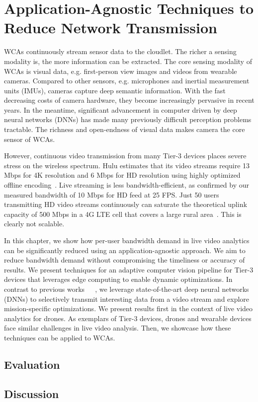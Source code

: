 \chapter{Application-Agnostic Techniques to Reduce Network Transmission}
\label{chapter: bandwidth}

WCAs continuously stream sensor data to the cloudlet. The richer a sensing
modality is, the more information can be extracted. The core sensing modality of
WCAs is visual data, e.g. first-person view images and videos from wearable
cameras. Compared to other sensors, e.g. microphones and inertial measurement
units (IMUs), cameras capture deep semantic information. With the fast
decreasing costs of camera hardware, they become increasingly pervasive in
recent years. In the meantime, significant advancement in computer driven by
deep neural networks (DNNs) has made many previously difficult perception
problems tractable. The richness and open-endness of visual data makes camera
the core sensor of WCAs.

However, continuous video transmission from many Tier-3 devices places severe
stress on the wireless spectrum.  Hulu estimates that its video streams require
13 Mbps for 4K resolution and 6 Mbps for HD resolution using highly optimized
offline encoding~\cite{Hulu2017}. Live streaming is less bandwidth-efficient, as
confirmed by our measured bandwidth of 10 Mbps for HD feed at 25 FPS. Just 50
users transmitting HD video streams continuously can saturate the theoretical
uplink capacity of 500 Mbps in a 4G LTE cell that covers a large rural
area~\cite{LteWorld2009}.  This is clearly not scalable.

In this chapter, we show how per-user bandwidth demand in live video analytics
can be significantly reduced using an application-agnostic approach. We aim to
reduce bandwidth demand without compromising the timeliness or accuracy of
results. We present techniques for an adaptive computer vision pipeline for
Tier-3 devices that leverages edge computing to enable dynamic optimizations. In
contrast to previous
works~\cite{Wang2017networked}~\cite{zhang2015design}~\cite{Wang2016skyeyes}, we
leverage state-of-the-art deep neural networks (DNNs) to selectively transmit
interesting data from a video stream and explore mission-specific optimizations.
We present results first in the context of live video analytics for drones. As
exemplars of Tier-3 devices, drones and wearable devices face similar challenges
in live video analysis. Then, we showcase how these techniques can be applied to
WCAs.




\section{Evaluation}
\section{Discussion}